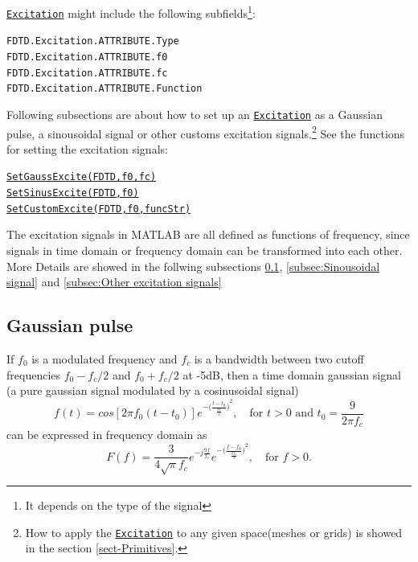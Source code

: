 \hyperref[para:Excitation]{\texttt{Excitation}} might include the following  subfields\footnote{It depends on the type of the signal}: 
       \begin{myindentpar}
	      \texttt{FDTD.Excitation.ATTRIBUTE.Type} \\ 
	      \texttt{FDTD.Excitation.ATTRIBUTE.f0} \\ 
	      \texttt{FDTD.Excitation.ATTRIBUTE.fc} \\
              \texttt{FDTD.Excitation.ATTRIBUTE.Function}
       \end{myindentpar}

 Following subsections are  about how to set up an \hyperref[para:Excitation]{\texttt{Excitation}} as a Gaussian pulse, a sinousoidal signal or other customs excitation signals.\footnote{How to apply the \hyperref[para:Excitation]{\texttt{Excitation}}  to any given space(meshes or grids) is showed in the section \ref{sect-Primitives}.} See the functions for setting the excitation signals:
       \begin{myindentpar}
	      \hyperref[func:SetGaussExcite]{\texttt{SetGaussExcite(FDTD,f0,fc)}} \\ 
	      \hyperref[func:SetSinusExcite]{\texttt{SetSinusExcite(FDTD,f0)}}\\ 
	      \hyperref[func:SetCustomExcite]{\texttt{SetCustomExcite(FDTD,f0,funcStr)}}
       \end{myindentpar}
The excitation signals in MATLAB are all defined as  functions of frequency, since signals in time domain or frequency domain can be transformed into each other.   More Details are showed in the follwing subsections \ref{subsec:Gaussian pulse}, \ref{subsec:Sinousoidal signal} and \ref{subsec:Other excitation signals}


    \subsection{Gaussian pulse} \label{subsec:Gaussian pulse}
If $f_0$ is a modulated frequency and $f_c$ is a bandwidth between  two cutoff frequencies $f_0-f_c/2$ and  $f_0+f_c/2$ at -5dB, then a time domain gaussian signal (a pure gaussian signal modulated by a cosinusoidal signal)
\begin{equation}\label{equ:GussianSignal_time}
 f(t)=cos[2\pi f_0(t-t_0)]e^{-{\big(\frac{t-t_0}{\frac{t0}{3}}\big)}^2}, \quad \text{for } t>0 \text{ and }t_0=\frac{9}{2\pi f_c}
\end{equation}
can be expressed  in frequency domain as
\begin{equation}\label{equ:GussianSignal_freq}
F(f)=\frac{3}{4\sqrt{\pi}f_c}e^{-j\frac{9f}{f_c}}e^{-{\big(\frac{f-f_0}{\frac{2f_c}{3}}\big)}^2},\quad \text{for } f>0 .
\end{equation}

